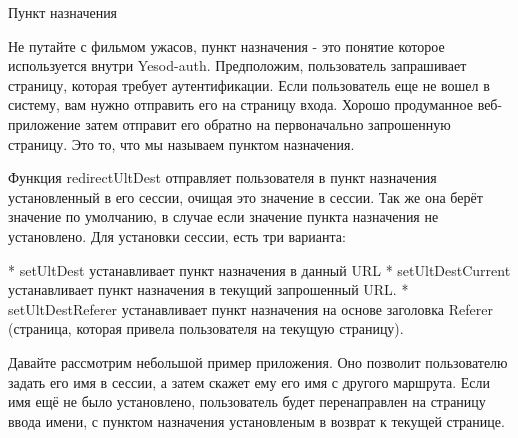 Пункт назначения

Не путайте с фильмом ужасов, пункт назначения - это понятие которое используется внутри Yesod-auth. Предположим, пользователь запрашивает страницу, которая требует аутентификации. Если пользователь еще не вошел в систему, вам нужно отправить его на страницу входа. Хорошо продуманное веб-приложение затем отправит его обратно на первоначально запрошенную страницу. Это то, что мы называем пунктом назначения. 

Функция redirectUltDest отправляет пользователя в пункт назначения установленный в его сессии, очищая это значение в сессии. Так же она берёт значение по умолчанию, в случае если значение пункта назначения не установлено. Для установки сессии, есть три варианта:

* setUltDest устанавливает пункт назначения в данный URL
* setUltDestCurrent устанавливает пункт назначения в текущий запрошенный URL.
* setUltDestReferer устанавливает пункт назначения на основе заголовка Referer (страница, которая привела пользователя на текущую страницу). 

Давайте рассмотрим небольшой пример приложения. Оно позволит пользователю задать его имя в сессии, а затем скажет ему его имя с другого маршрута. Если имя ещё не было установлено, пользователь будет перенаправлен на страницу ввода имени, с пунктом назначения установленым в возврат к текущей странице.

